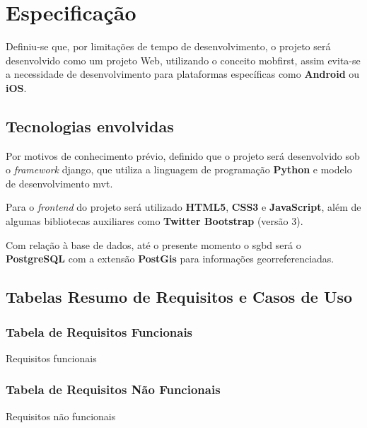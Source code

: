 \chapter{Especificação}\label{chp: Especificação}
Definiu-se que, por limitações de tempo de desenvolvimento, o projeto será desenvolvido como um projeto Web, utilizando o conceito \gls{mobfirst}, assim evita-se a necessidade de desenvolvimento para plataformas específicas como \textbf{Android} ou \textbf{iOS}.

\section{Tecnologias envolvidas}\label{sec: TecEnvolv}
Por motivos de conhecimento prévio, definido que o projeto será desenvolvido sob o \textit{framework} \gls{django}, que utiliza a linguagem de programação \textbf{Python} e modelo de desenvolvimento \gls{mvt}.

Para o \textit{frontend} do projeto será utilizado \textbf{HTML5}, \textbf{CSS3} e \textbf{JavaScript}, além de algumas bibliotecas auxiliares como \textbf{Twitter Bootstrap} (versão 3).

Com relação à base de dados, até o presente momento o \gls{sgbd} será o \textbf{PostgreSQL} com a extensão \textbf{PostGis} para informações georreferenciadas.




\section{Tabelas Resumo de Requisitos e Casos de Uso}
\subsection{Tabela de Requisitos Funcionais}\label{subsec:tabResReqF}
   \begin{table}[H]
        \centering
        \caption{Requisitos funcionais}
        \label{tab:reqFunc}
        \PrintRequisitosFunc
    \end{table}
    

\subsection{Tabela de Requisitos Não Funcionais}\label{subsec:tabResReqNF}
   \begin{table}[H]
        \centering
        \caption{Requisitos não funcionais}
        \label{tab:reqNFunc}
        \PrintRequisitosNFunc
    \end{table}

